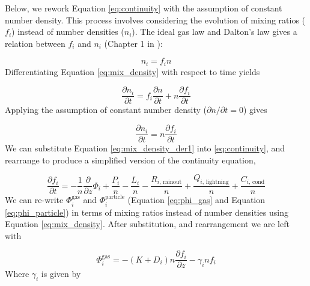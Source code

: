 \documentclass{article}
\begin{document}

Below, we rework Equation \eqref{eq:continuity} with the assumption of constant number density. This process involves considering the evolution of mixing ratios ($f_i$) instead of number densities ($n_i$). The ideal gas law and Dalton's law gives a relation between $f_i$ and $n_i$ (Chapter 1 in \cite{Catling_2017}):

\begin{equation} \label{eq:mix_density}
  n_i = f_i n
\end{equation}
Differentiating Equation \eqref{eq:mix_density} with respect to time yields

\begin{equation} \label{eq:mix_density_der}
  \frac{\partial n_i}{\partial t} = f_i \frac{\partial n}{\partial t} + n \frac{\partial f_i}{\partial t}
\end{equation}
Applying the assumption of constant number density ($\partial n / \partial t = 0$) gives

\begin{equation} \label{eq:mix_density_der1}
  \frac{\partial n_i}{\partial t} = n \frac{\partial f_i}{\partial t}
\end{equation}
We can substitute Equation \eqref{eq:mix_density_der1} into \eqref{eq:continuity}, and rearrange to produce a simplified version of the continuity equation,

\begin{equation} \label{eq:continuity_simple}
  \boxed{\frac{\partial f_{i}}{\partial t} = - \frac{1}{n}\frac{\partial}{\partial z}\Phi_{i} + \frac{P_{i}}{n} - \frac{L_{i}}{n} - \frac{R_{i\text{, rainout}}}{n} + \frac{Q_{i\text{, lightning}}}{n} + \frac{C_{i\text{, cond}}}{n}}
\end{equation}
We can re-write $\Phi_{i}^\text{gas}$ and $\Phi_{i}^\text{particle}$ (Equation \eqref{eq:phi_gas} and Equation \eqref{eq:phi_particle}) in terms of mixing ratios instead of number densities using Equation \eqref{eq:mix_density}. After substitution, and rearrangement we are left with

\begin{equation} \label{eq:phi_gas_1}
  \boxed{\Phi_{i}^\text{gas} = - \left( K + D_{i} \right)n\frac{\partial f_{i}}{\partial z} - \gamma_{i}nf_{i}}
\end{equation}
Where $\gamma_{i}$ is given by
\end{document}
